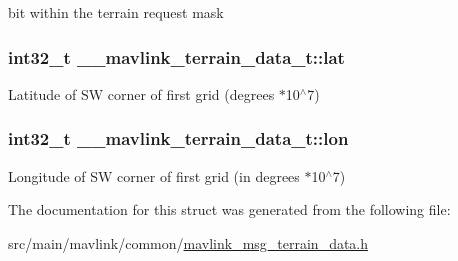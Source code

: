 bit within the terrain request mask 

\hypertarget{struct____mavlink__terrain__data__t_a5ba602eaa2166b88b73d0107f8d6e5d5}{
\subsubsection[{lat}]{\setlength{\rightskip}{0pt plus 5cm}int32\+\_\+t \+\_\+\+\_\+mavlink\+\_\+terrain\+\_\+data\+\_\+t\+::lat}}\label{struct____mavlink__terrain__data__t_a5ba602eaa2166b88b73d0107f8d6e5d5}


Latitude of S\+W corner of first grid (degrees $\ast$10$^\wedge$7) 

\hypertarget{struct____mavlink__terrain__data__t_afd1029770f4bf58ac24f239ad0b2d314}{
\subsubsection[{lon}]{\setlength{\rightskip}{0pt plus 5cm}int32\+\_\+t \+\_\+\+\_\+mavlink\+\_\+terrain\+\_\+data\+\_\+t\+::lon}}\label{struct____mavlink__terrain__data__t_afd1029770f4bf58ac24f239ad0b2d314}


Longitude of S\+W corner of first grid (in degrees $\ast$10$^\wedge$7) 



The documentation for this struct was generated from the following file\+:\begin{DoxyCompactItemize}
\item 
src/main/mavlink/common/\hyperlink{mavlink__msg__terrain__data_8h}{mavlink\+\_\+msg\+\_\+terrain\+\_\+data.\+h}\end{DoxyCompactItemize}
